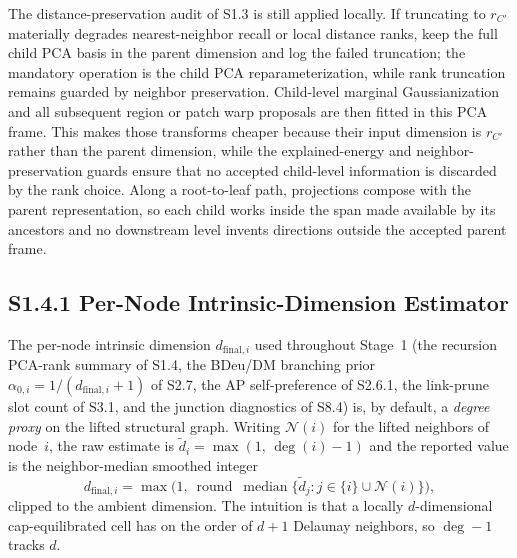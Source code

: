 \documentclass[11pt]{article}
\begin{document}
The distance-preservation audit of S1.3 is still applied locally. If truncating to $r_{C'}$ materially degrades nearest-neighbor recall or local distance ranks, keep the full child PCA basis in the parent dimension and log the failed truncation; the mandatory operation is the child PCA reparameterization, while rank truncation remains guarded by neighbor preservation. Child-level marginal Gaussianization and all subsequent region or patch warp proposals are then fitted in this PCA frame. This makes those transforms cheaper because their input dimension is $r_{C'}$ rather than the parent dimension, while the explained-energy and neighbor-preservation guards ensure that no accepted child-level information is discarded by the rank choice. Along a root-to-leaf path, projections compose with the parent representation, so each child works inside the span made available by its ancestors and no downstream level invents directions outside the accepted parent frame.

\subsection*{S1.4.1 Per-Node Intrinsic-Dimension Estimator}
\label{sec:si-intrinsic-dim}
The per-node intrinsic dimension $d_{\mathrm{final},i}$ used throughout Stage~1
(the recursion PCA-rank summary of S1.4, the BDeu/DM branching prior
$\alpha_{0,i}=1/(d_{\mathrm{final},i}+1)$ of S2.7, the AP self-preference of
S2.6.1, the link-prune slot count of S3.1, and the junction diagnostics of
S8.4) is, by default, a \emph{degree proxy} on the lifted structural graph.
Writing $\mathcal N(i)$ for the lifted neighbors of node~$i$, the raw estimate
is $\widetilde d_i=\max(1,\,\deg(i)-1)$ and the reported value is the
neighbor-median smoothed integer
\[
d_{\mathrm{final},i}
=\max\!\Big(1,\ \operatorname{round}\ \operatorname{median}
\big\{\widetilde d_j:j\in\{i\}\cup\mathcal N(i)\big\}\Big),
\]
clipped to the ambient dimension. The intuition is that a locally
$d$-dimensional cap-equilibrated cell has on the order of $d+1$ Delaunay
neighbors, so $\deg-1$ tracks $d$.
\end{document}
